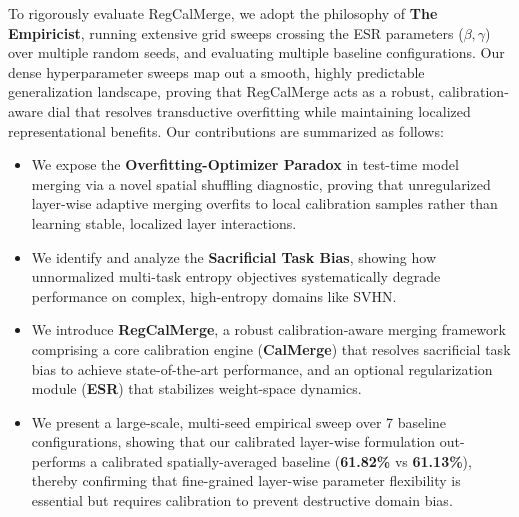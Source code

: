 To rigorously evaluate RegCalMerge, we adopt the philosophy of \textbf{The Empiricist}, running extensive grid sweeps crossing the ESR parameters ($\beta, \gamma$) over multiple random seeds, and evaluating multiple baseline configurations. Our dense hyperparameter sweeps map out a smooth, highly predictable generalization landscape, proving that RegCalMerge acts as a robust, calibration-aware dial that resolves transductive overfitting while maintaining localized representational benefits. Our contributions are summarized as follows:
\begin{itemize}
    \item We expose the \textbf{Overfitting-Optimizer Paradox} in test-time model merging via a novel spatial shuffling diagnostic, proving that unregularized layer-wise adaptive merging overfits to local calibration samples rather than learning stable, localized layer interactions.
    \item We identify and analyze the \textbf{Sacrificial Task Bias}, showing how unnormalized multi-task entropy objectives systematically degrade performance on complex, high-entropy domains like SVHN.
    \item We introduce \textbf{RegCalMerge}, a robust calibration-aware merging framework comprising a core calibration engine (\textbf{CalMerge}) that resolves sacrificial task bias to achieve state-of-the-art performance, and an optional regularization module (\textbf{ESR}) that stabilizes weight-space dynamics.
    \item We present a large-scale, multi-seed empirical sweep over 7 baseline configurations, showing that our calibrated layer-wise formulation out-performs a calibrated spatially-averaged baseline (\textbf{61.82\%} vs \textbf{61.13\%}), thereby confirming that fine-grained layer-wise parameter flexibility is essential but requires calibration to prevent destructive domain bias.
\end{itemize}